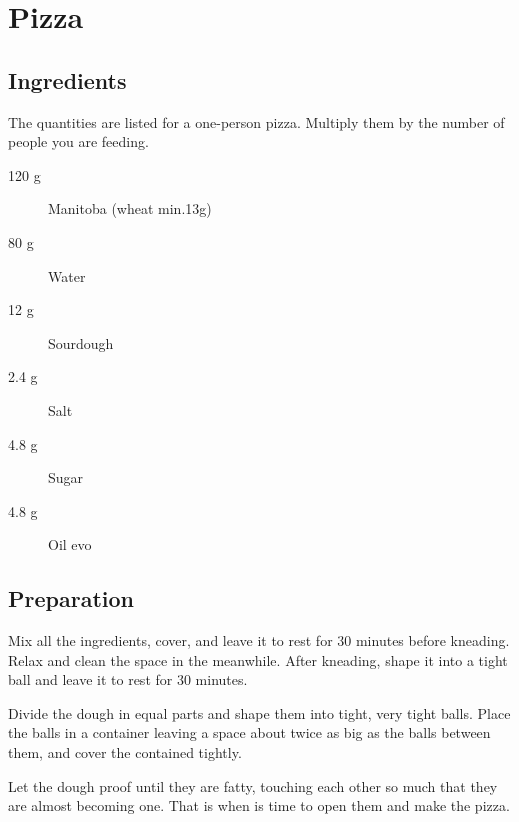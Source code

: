 \setchapterpreamble[u]{\margintoc}
\chapter{Pizza}

\section{Ingredients}
The quantities are listed for a one-person pizza. Multiply them by the number of people you are feeding.

\begin{multicols}{2}
\begin{description}
	\item[120 g] Manitoba (wheat min.13g)
	\item[80 g] Water
	\item[12 g] Sourdough
	\item[2.4 g] Salt
	\item[4.8 g] Sugar
	\item[4.8 g] Oil \gls{evo}
\end{description}
\end{multicols}

\section{Preparation}
Mix all the ingredients, cover, and leave it to rest for $30$ minutes before kneading.
%
Relax and clean the space in the meanwhile.
%
After kneading, shape it into a tight ball and leave it to rest for $30$ minutes.

Divide the dough in equal parts and shape them into tight, very tight balls.
%
Place the balls in a container leaving a space about twice as big as the balls between them, and cover the contained tightly.

Let the dough proof until they are fatty, touching each other so much that they are almost becoming one. That is when is time to open them and make the pizza.

